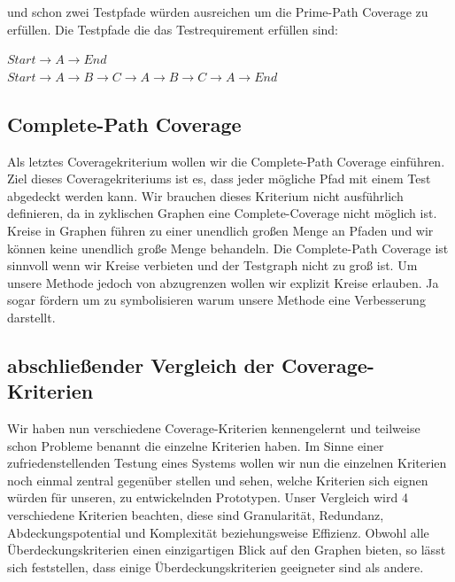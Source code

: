und schon zwei Testpfade würden ausreichen um die Prime-Path Coverage zu erfüllen.
Die Testpfade die das Testrequirement erfüllen sind:

$Start \rightarrow A \rightarrow End$ \\
$Start \rightarrow A \rightarrow B \rightarrow C \rightarrow A \rightarrow B \rightarrow C \rightarrow A \rightarrow End$

\subsection{Complete-Path Coverage}

Als letztes Coveragekriterium wollen wir die Complete-Path Coverage einführen.
Ziel dieses Coveragekriteriums ist es, dass jeder mögliche Pfad mit einem Test abgedeckt werden kann.
Wir brauchen dieses Kriterium nicht ausführlich definieren, da in zyklischen Graphen eine Complete-Coverage nicht möglich ist.
Kreise in Graphen führen zu einer unendlich großen Menge an Pfaden und wir können keine unendlich große Menge behandeln.
Die Complete-Path Coverage ist sinnvoll wenn wir Kreise verbieten und der Testgraph nicht zu groß ist.
Um unsere Methode jedoch von \cite[Property-based Testing]{property-based-testing} abzugrenzen wollen wir explizit Kreise erlauben.
Ja sogar fördern um zu symbolisieren warum unsere Methode eine Verbesserung darstellt.

\subsection{abschließender Vergleich der Coverage-Kriterien}

Wir haben nun verschiedene Coverage-Kriterien kennengelernt und teilweise schon Probleme benannt die einzelne
Kriterien haben.
Im Sinne einer zufriedenstellenden Testung eines Systems wollen wir nun die einzelnen Kriterien noch einmal
zentral gegenüber stellen und sehen, welche Kriterien sich eignen würden für unseren, zu entwickelnden Prototypen.
Unser Vergleich wird 4 verschiedene Kriterien beachten, diese sind Granularität, Redundanz, Abdeckungspotential und Komplexität beziehungsweise Effizienz.
Obwohl alle Überdeckungskriterien einen einzigartigen Blick auf den Graphen bieten, so lässt sich feststellen, dass
einige Überdeckungskriterien geeigneter sind als andere.

